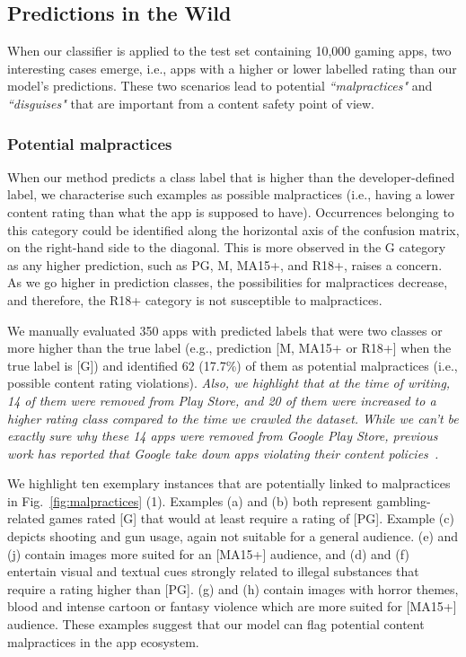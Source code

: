 \subsection{Predictions in the Wild}

When our classifier is applied to the test set containing 10,000 gaming apps, two interesting cases emerge, i.e., apps with a higher or lower labelled rating than our model's predictions. These two scenarios lead to potential  \emph{``malpractices"} and \emph{``disguises"} that are important from a content safety point of view. 

\subsubsection{Potential malpractices}
\label{subsec: potential malpractices}

When our method predicts a class label that is higher than the developer-defined label, we characterise such examples as possible malpractices (i.e., having a lower content rating than what the app is supposed to have). Occurrences belonging to this category could be identified along the horizontal axis of the confusion matrix, on the right-hand side to the diagonal. This is more observed in the G category as any higher prediction, such as PG, M, MA15+, and R18+, raises a concern. As we go higher in prediction classes, the possibilities for malpractices decrease, and therefore, the R18+ category is not susceptible to malpractices. 

We manually evaluated 350 apps with predicted labels that were two classes or more higher than the true label (e.g., prediction [M, MA15+ or R18+] when the true label is [G]) and identified 62 (17.7\%) of them as potential malpractices (i.e., possible content rating violations). \textit{Also, we highlight that at the time of writing, 14 of them were removed from Play Store, and 20 of them were increased to a higher rating class compared to the time we crawled the dataset. While we can't be exactly sure why these 14 apps were removed from  Google Play Store, previous work has reported that Google take down apps violating their content policies~\cite{seneviratne2015early}.} 

We highlight ten exemplary instances that are potentially linked to malpractices in Fig.~\ref{fig:malpractices} (1). Examples (a) and (b) both represent gambling-related games rated [G] that would at least require a rating of [PG]. Example (c) depicts shooting and gun usage, again not suitable for a general audience. (e) and (j) contain images more suited for an [MA15+] audience, and (d) and (f) entertain visual and textual cues strongly related to illegal substances that require a rating higher than [PG]. (g) and (h) contain images with horror themes, blood and intense cartoon or fantasy violence which are more suited for [MA15+] audience. These examples suggest that our model can flag potential content malpractices in the app ecosystem.


